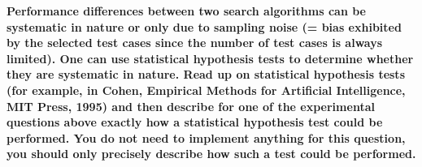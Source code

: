 \documentclass[a4 paper]{article}
\begin{document}
\newpage
{}

\textbf 
{ \hspace{-21pt} Performance differences between two search algorithms can be systematic
in nature or only due to sampling noise (= bias exhibited by the selected test cases since the number of test cases is always
limited). One can use statistical hypothesis tests to determine whether they are systematic in nature. Read up on statistical
hypothesis tests (for example, in Cohen, Empirical Methods for Artificial Intelligence, MIT Press, 1995) and then describe
for one of the experimental questions above exactly how a statistical hypothesis test could be performed. You do not need
to implement anything for this question, you should only precisely describe how such a test could be performed.}
\end{document}
